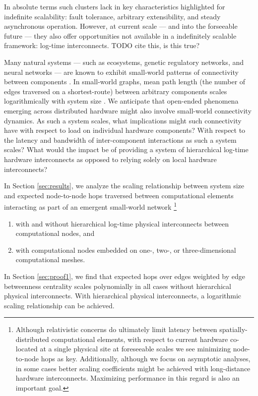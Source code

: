 In absolute terms such clusters lack in key characteristics highlighted for indefinite scalability: fault tolerance, arbitrary extensibility, and steady asynchronous operation.
However, at current scale --- and into the forseeable future --- they also offer opportunities not available in a indefinitely scalable framework: log-time interconnects.
TODO cite this, is this true?

Many natural systems --- such as ecosystems, genetic regulatory networks, and neural networks --- are known to exhibit small-world patterns of connectivity between components \citep{bassett2017small, fox2014herbivores, gaiteri2014beyond}.
In small-world graphs, mean path length (the number of edges traversed on a shortest-route) between arbitrary components scales logarithmically with system size \citep{watts1998collective}.
We anticipate that open-ended phenomena emerging across distributed hardware might also involve small-world connectivity dynamics.
As such a system scales, what implications might such connectivity have with respect to load on individual hardware components?
With respect to the latency and bandwidth of inter-component interactions as such a system scales?
What would the impact be of providing a system of hierarchical log-time hardware interconnects as opposed to relying solely on local hardware interconnects?

In Section \ref{sec:results}, we analyze the scaling relationship between system size and expected node-to-node hops traversed between computational elements interacting as part of an emergent small-world network
\footnote{
Although relativistic concerns do ultimately limit latency between spatially-distributed computational elements, with respect to current hardware co-located at a single physical site at foreseeable scales we see minimizing node-to-node hops as key.
Additionally, although we focus on asymptotic analyses, in some cases better scaling coefficients might be achieved with long-distance hardware interconnects.
Maximizing performance in this regard is also an important goal.
}
\begin{enumerate}
\item with and without hierarchical log-time physical interconnects between computational nodes, and
\item with computational nodes embedded on one-, two-, or three-dimensional computational meshes.
\end{enumerate}

In Section \ref{sec:proof1}, we find that expected hops over edges weighted by edge betweenness centrality scales polynomially in all cases without hierarchical physical interconnects.
With hierarchical physical interconnects, a logarithmic scaling relationship can be achieved.

